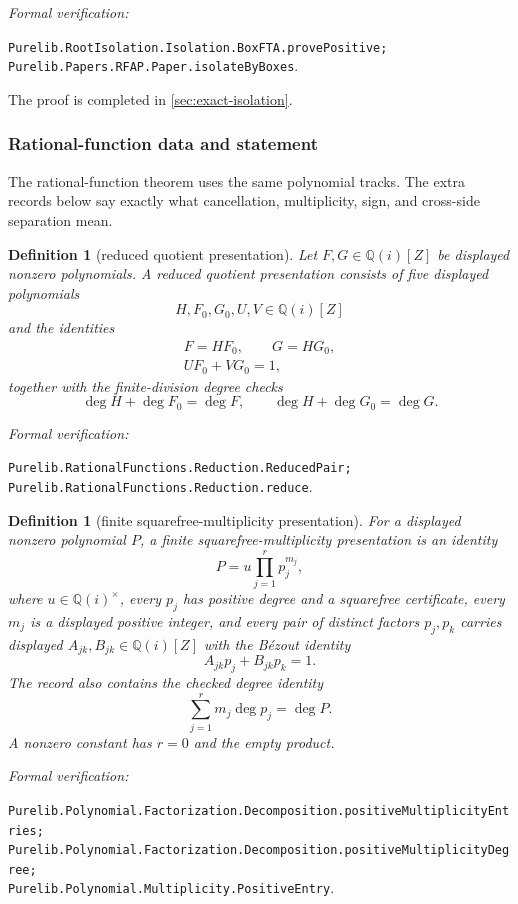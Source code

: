 \documentclass[11pt]{article}
\newtheorem{definition}[theorem]{Definition}
\newcommand{\Qi}{\mathbb{Q}(i)}
\newcommand{\leanref}[1]{\par\smallskip\noindent
  \emph{Formal verification:}\par\nobreak
  {\raggedright\nolinkurl{#1}.\par}}
\begin{document}
\leanref{Purelib.RootIsolation.Isolation.BoxFTA.provePositive; Purelib.Papers.RFAP.Paper.isolateByBoxes}

The proof is completed in \cref{sec:exact-isolation}.

\subsubsection{Rational-function data and statement}

The rational-function theorem uses the same polynomial tracks.  The extra
records below say exactly what cancellation, multiplicity, sign, and
cross-side separation mean.

\begin{definition}[reduced quotient presentation]
\label{def:reduced-quotient}
Let $F,G\in\Qi[Z]$ be displayed nonzero polynomials.  A
\emph{reduced quotient presentation} consists of five displayed polynomials
\[
                        H,F_0,G_0,U,V\in\Qi[Z]
\]
and the identities
\[
 \begin{gathered}
 F=HF_0,\qquad G=HG_0,\\
 UF_0+VG_0=1,
 \end{gathered}
\]
together with the finite-division degree checks
\[
 \deg H+\deg F_0=\deg F,
 \qquad
 \deg H+\deg G_0=\deg G.
\]
\end{definition}

\leanref{Purelib.RationalFunctions.Reduction.ReducedPair;
Purelib.RationalFunctions.Reduction.reduce}

\begin{definition}[finite squarefree-multiplicity presentation]
\label{def:squarefree-multiplicity-presentation}
For a displayed nonzero polynomial $P$, a
\emph{finite squarefree-multiplicity presentation} is an identity
\[
                 P=u\prod_{j=1}^{r}p_j^{m_j},
\]
where $u\in\Qi^\times$, every $p_j$ has positive degree and a squarefree
certificate, every $m_j$ is a displayed positive integer, and every pair of
distinct factors $p_j,p_k$ carries displayed $A_{jk},B_{jk}\in\Qi[Z]$ with
the Bézout identity
\[
                 A_{jk}p_j+B_{jk}p_k=1.
\]
The record also contains the checked degree identity
\[
                  \sum_{j=1}^{r}m_j\deg p_j=\deg P.
\]
A nonzero constant has $r=0$ and the empty product.
\end{definition}

\leanref{Purelib.Polynomial.Factorization.Decomposition.positiveMultiplicityEntries;
Purelib.Polynomial.Factorization.Decomposition.positiveMultiplicityDegree;
Purelib.Polynomial.Multiplicity.PositiveEntry}
\end{document}
